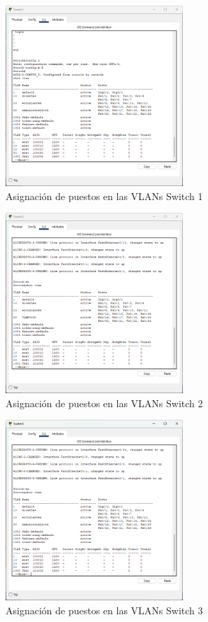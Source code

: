     \begin{figure}[H]
        \centering
        \includegraphics[width=0.6\textwidth]{img/switch1vlan.png}
        \caption{Asignación de puestos en las VLANs Switch 1}
        \label{fig:swvla1}
    \end{figure}
    \begin{figure}[H]
        \centering
        \includegraphics[width=0.6\textwidth]{img/swtichvlan2.png}
        \caption{Asignación de puestos en las VLANs Switch 2}
        \label{fig:swvla2}
    \end{figure}
    \begin{figure}[H]
        \centering
        \includegraphics[width=0.6\textwidth]{img/switchvlan3.png}
        \caption{Asignación de puestos en las VLANs Switch 3}
        \label{fig:swvla3}
    \end{figure}
